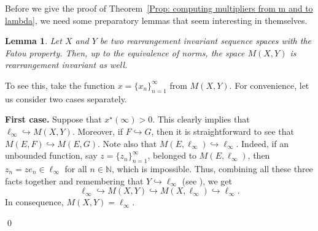 \documentclass[11pt]{amsart}
\theoremstyle{definition}
\theoremstyle{definition}
\newtheorem{lemma}[theorem]{Lemma}
\theoremstyle{definition}
\theoremstyle{definition}
\theoremstyle{definition}
\theoremstyle{definition}
\theoremstyle{definition}
\theoremstyle{definition}
\numberwithin{equation}{section}
\numberwithin{equation}{section}
\numberwithin{equation}{section}
\theoremstyle{definition}
\theoremstyle{definition}
\theoremstyle{definition}
\theoremstyle{definition}
\theoremstyle{definition}
\theoremstyle{definition}
\renewenvironment{proof}{\noindent {\bf Proof.}}{\qed}
\begin{document}
	Before we give the proof of Theorem~\ref{Prop: computing multipliers from m and to lambda},
	we need some preparatory lemmas that seem interesting in themselves.
	
	\begin{lemma} \label{LEMMA: M(X,Y) is r.i.}
		{\it Let $X$ and $Y$ be two rearrangement invariant sequence spaces with the Fatou property.
		Then, up to the equivalence of norms, the space $M(X,Y)$ is rearrangement invariant as well.}
	\end{lemma}
	\begin{proof}
		To see this, take the function $x = \{x_n\}_{n=1}^{\infty}$ from $M(X,Y)$. For convenience, let us consider two cases separately.
		
		{\bf First case.} Suppose that $x^{\star}(\infty) > 0$.
		This clearly implies that $\ell_{\infty} \hookrightarrow M(X,Y)$. Moreover, if $F \hookrightarrow G$, then it is straightforward to
		see that $M(E,F) \hookrightarrow M(E,G)$. Note also that $M(E,\ell_{\infty}) \hookrightarrow \ell_{\infty}$. Indeed, if an unbounded
		function, say $z = \{z_n\}_{n=1}^{\infty}$, belonged to $M(E,\ell_{\infty})$, then $z_n = z e_n \in \ell_{\infty}$ for all $n \in \mathbb{N}$,
		which is impossible. Thus, combining all these three facts together and remembering that $Y \hookrightarrow \ell_{\infty}$
		(see \cite[Corollary~6.7, p.~78]{BS88}), we get
		\begin{equation*}
			\ell_{\infty} \hookrightarrow M(X,Y) \hookrightarrow M(X,\ell_{\infty}) \hookrightarrow \ell_{\infty}.
		\end{equation*}
		In consequence, $M(X,Y) = \ell_{\infty}$.
		

\end{proof}
\end{document}
